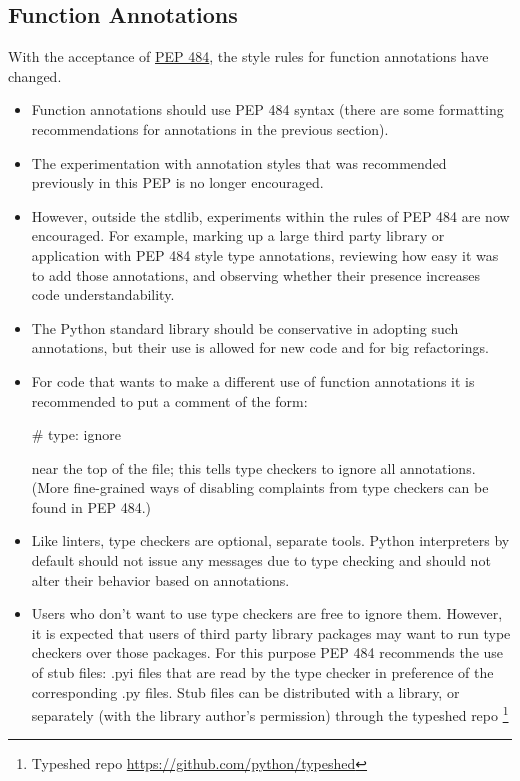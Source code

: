 \documentclass[a4paper,11pt]{article}
\begin{document}
\subsection{Function Annotations}
\label{sec:function_annotations}
With the acceptance of \href{https://peps.python.org/pep-0484/}{PEP 484}, the 
style rules for function annotations have changed.
\begin{itemize}
\item Function annotations should use PEP 484 syntax (there are some 
formatting recommendations for annotations in the previous section).
\item The experimentation with annotation styles that was recommended 
previously in this PEP is no longer encouraged.
\item However, outside the stdlib, experiments within the rules of PEP 484 
are now encouraged. For example, marking up a large third party library or 
application with PEP 484 style type annotations, reviewing how easy it was to 
add those annotations, and observing whether their presence increases code 
understandability.
\item The Python standard library should be conservative in adopting such 
annotations, but their use is allowed for new code and for big refactorings.
\item For code that wants to make a different use of function annotations it 
is recommended to put a comment of the form:
\begin{python}
# type: ignore
\end{python}
near the top of the file; this tells type checkers to ignore all annotations. 
(More fine-grained ways of disabling complaints from type checkers can be 
found in PEP 484.)
\item Like linters, type checkers are optional, separate tools. Python 
interpreters by default should not issue any messages due to type checking 
and should not alter their behavior based on annotations.
\item Users who don’t want to use type checkers are free to ignore them. 
However, it is expected that users of third party library packages may want 
to run type checkers over those packages. For this purpose PEP 484 recommends 
the use of stub files: .pyi files that are read by the type checker in 
preference of the corresponding .py files. Stub files can be distributed with 
a library, or separately (with the library author’s permission) through the 
typeshed repo \footnote{Typeshed repo
\href{https://github.com/python/typeshed}{https://github.com/python/typeshed}}
\end{itemize}
\end{document}
